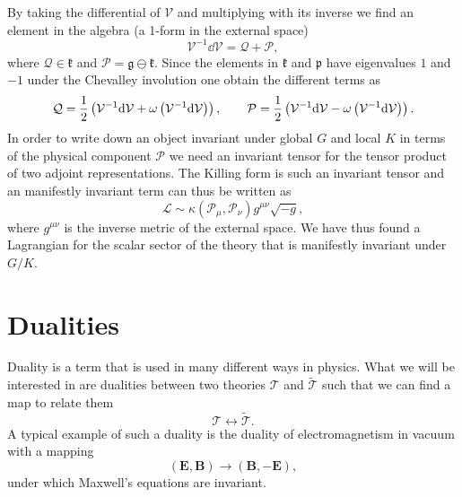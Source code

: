 By taking the differential of $\mathcal{V}$ and multiplying with its inverse we find an element in the algebra (a 1-form in the external space)
\begin{equation}
    \mathcal{V}^{-1}\dd \mathcal{V} = \mathcal{Q}+\mathcal{P},
\end{equation}
where $\mathcal{Q}\in\mathfrak{k}$ and $\mathcal{P}=\mathfrak{g}\ominus\mathfrak{k}$. Since the elements in $\mathfrak{k}$ and $\mathfrak{p}$ have eigenvalues $1$ and $-1$ under the Chevalley involution one obtain the different terms as
\begin{equation}
    \mathcal{Q} = \frac{1}{2}\left(\mathcal{V}^{-1}\mathrm{d} \mathcal{V}+\omega\left(\mathcal{V}^{-1}\mathrm{d} \mathcal{V}\right)\right),\\\qquad \mathcal{P} = \frac{1}{2}\left(\mathcal{V}^{-1}\mathrm{d} \mathcal{V}-\omega\left(\mathcal{V}^{-1}\mathrm{d} \mathcal{V}\right)\right).
\end{equation}
In order to write down an object invariant under global $G$ and local $K$ in terms of the physical component $\mathcal{P}$ we need an invariant tensor for the tensor product of two adjoint representations. The Killing form is such an invariant tensor and an manifestly invariant term can thus be written as 
\begin{equation}
    \mathcal{L} \sim \kappa(\mathcal{P}_\mu,\mathcal{P}_\nu)g^{\mu\nu}\sqrt{-g},
\end{equation}
where $g^{\mu\nu}$ is the inverse metric of the external space. We have thus found a Lagrangian for the scalar sector of the theory that is manifestly invariant under $G/K$. 


\section{Dualities}\label{sec:Dualities}
Duality is a term that is used in many different ways in physics. What we will be interested in are dualities between two theories $\mathscr{T}$ and $\tilde{\mathscr{T}}$ such that we can find a map to relate them 
\begin{equation}
    \mathscr{T} \leftrightarrow \mathscr{\tilde{T}}.
\end{equation}
A typical example of such a duality is the duality of electromagnetism in vacuum with a mapping 
\begin{equation}
    \left(\mathbf{E},\mathbf{B}\right) \to \left(\mathbf{B},-\mathbf{E}\right),
\end{equation}
under which Maxwell's equations are invariant. 


